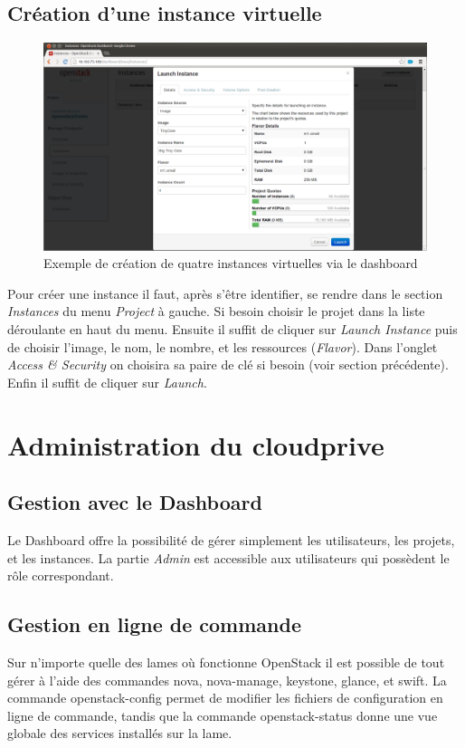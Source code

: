 \documentclass[a4paper,oneside]{report}
\begin{document}
\section{Création d'une instance virtuelle}
\begin{figure}[!h]
\centering
\includegraphics[resolution=200]{images/22_launch_instance.png}
\caption{Exemple de création de quatre instances virtuelles via le dashboard}
\end{figure}

Pour créer une instance il faut, après s'être identifier, se rendre dans le section \emph{Instances} du menu \emph{Project} à gauche.
Si besoin choisir le projet dans la liste déroulante en haut du menu.\newline 
Ensuite il suffit de cliquer sur \emph{Launch Instance} puis de choisir l'image, le nom, le nombre, et les ressources (\emph{Flavor}). Dans l'onglet \emph{Access \& Security} on choisira sa paire de clé si besoin (voir section précédente).\newline
Enfin il suffit de cliquer sur \emph{Launch}.

\chapter{Administration du \gls{cloudprive}}
\section{Gestion avec le Dashboard}
Le Dashboard offre la possibilité de gérer simplement les utilisateurs, les projets, et les instances. La partie \emph{Admin} est accessible aux utilisateurs qui possèdent le rôle correspondant.

\section{Gestion en ligne de commande}
Sur n'importe quelle des lames où fonctionne OpenStack il est possible de tout gérer à l'aide des commandes nova, nova-manage, keystone, glance, et swift. La commande openstack-config permet  de modifier les fichiers de configuration en ligne de commande, tandis que la commande openstack-status donne une vue globale des services installés sur la lame.
\end{document}
